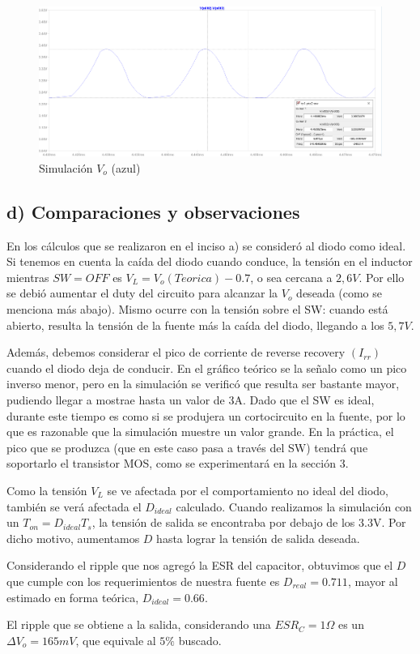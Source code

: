\documentclass[e4_tp1_main.tex]{subfiles}
\begin{document}
\begin{figure}[H]
  \centering
    \includegraphics[scale = 0.457]{Imagenes/punto2/Vo-D=0,711.PNG}
  \caption{Simulaci\'on $V_o$ (azul)}
  \label{fig:IL&ID}
\end{figure}

\subsection*{d) Comparaciones y observaciones}

En los c\'alculos que se realizaron en el inciso a) se consider\'o al diodo como ideal. Si tenemos en cuenta la ca\'ida del diodo cuando conduce, la tensi\'on en el inductor mientras $SW=OFF$ es $V_{L}=V_o(Teorica)-0.7$, o sea cercana a $2,6V$. Por ello se debió aumentar el duty del circuito para alcanzar la $V_o$ deseada (como se menciona más abajo). Mismo ocurre con la tensión sobre el SW: cuando está abierto, resulta la tensión de la fuente más la caída del diodo, llegando a los $5,7V$.\par 
Adem\'as, debemos considerar el pico de corriente de reverse recovery $(I_{rr})$ cuando el diodo deja de conducir. En el gráfico teórico se la señalo como un pico inverso menor, pero en la simulación se verificó que resulta ser bastante mayor, pudiendo llegar a mostrae hasta un valor de 3A. Dado que el SW es ideal, durante este tiempo es como si se produjera un cortocircuito en la fuente, por lo que es razonable que la simulación muestre un valor grande. En la práctica, el pico que se produzca (que en este caso pasa a través del SW) tendrá que soportarlo el transistor MOS, como se experimentará en la sección 3. 



Como la tensi\'on $V_L$ se ve afectada por el comportamiento no ideal del diodo, tambi\'en se ver\'a afectada el $D_{ideal}$ calculado.
Cuando realizamos la simulaci\'on con un $T_{on}=D_{ideal}T_s$, la tensi\'on de salida se encontraba por debajo de los 3.3V. Por dicho motivo, aumentamos $D$ hasta lograr la tensi\'on de salida deseada. 

Considerando el ripple que nos agreg\'o la ESR del capacitor, obtuvimos que el $D$ que cumple con los requerimientos de nuestra fuente es $D_{real}=0.711$, mayor al estimado en forma teórica, $D_{ideal} = 0.66$.

El ripple que se obtiene a la salida, considerando una $ESR_C=1\Omega$ es un $\Delta V_o = 165mV$, que equivale al $5\%$ buscado.






\newpage
\end{document}
